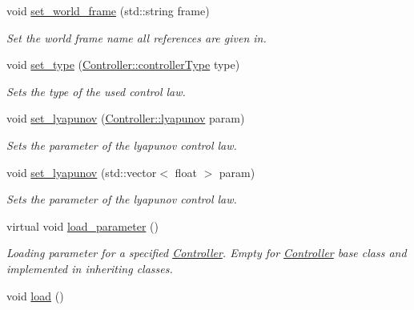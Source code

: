 \begin{DoxyCompactItemize}
\item 
void \hyperlink{classController_aeeb360dd2e4afb5c654f5bca4c0f00ca}{set\+\_\+world\+\_\+frame} (std\+::string frame)
\begin{DoxyCompactList}\small\item\em Set the world frame name all references are given in. \end{DoxyCompactList}\item 
void \hyperlink{classController_a7134d173f5f91755d8a3c7e07ca04da9}{set\+\_\+type} (\hyperlink{classController_a86221d052db839985bd6e4d73013cd06}{Controller\+::controller\+Type} type)
\begin{DoxyCompactList}\small\item\em Sets the type of the used control law. \end{DoxyCompactList}\item 
void \hyperlink{classController_a2ebb5b813be3525b44af61eb6f165964}{set\+\_\+lyapunov} (\hyperlink{structController_1_1lyapunov}{Controller\+::lyapunov} param)
\begin{DoxyCompactList}\small\item\em Sets the parameter of the lyapunov control law. \end{DoxyCompactList}\item 
void \hyperlink{classController_afb2d5fec93db7b68a16767823f4c1675}{set\+\_\+lyapunov} (std\+::vector$<$ float $>$ param)
\begin{DoxyCompactList}\small\item\em Sets the parameter of the lyapunov control law. \end{DoxyCompactList}\item 
virtual void \hyperlink{classController_a0758387181bc5902176813cc686cb088}{load\+\_\+parameter} ()\hypertarget{classController_a0758387181bc5902176813cc686cb088}{}\label{classController_a0758387181bc5902176813cc686cb088}

\begin{DoxyCompactList}\small\item\em Loading parameter for a specified \hyperlink{classController}{Controller}. Empty for \hyperlink{classController}{Controller} base class and implemented in inheriting classes. \end{DoxyCompactList}\item 
void \hyperlink{classController_a55c77d2e41634c9b21543647f74eec4c}{load} ()\hypertarget{classController_a55c77d2e41634c9b21543647f74eec4c}{}\label{classController_a55c77d2e41634c9b21543647f74eec4c}


\end{DoxyCompactItemize}
